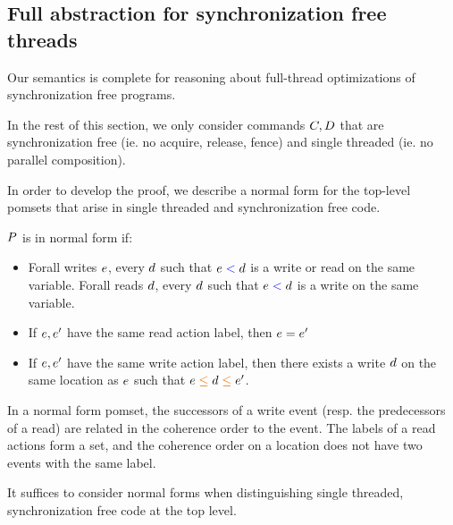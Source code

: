 \subsection{Full abstraction for synchronization free threads}
Our semantics is complete for reasoning about full-thread optimizations of synchronization free programs.

In the rest of this section, we only consider commands $C,D$ that are synchronization free (ie. no acquire, release, fence) and single threaded (ie. no parallel composition). 

In order to develop the proof, we describe a normal form for the top-level pomsets that arise in single threaded and synchronization free code.  

\begin{definition}
$P$ is in normal form if:
\begin{itemize}
\item Forall writes $e$, every $d$ such that $e \mathrel{{\color{blue}<}} d$ is a write or read on the same variable.
        Forall reads  $d$, every $d$ such that $e \mathrel{{\color{blue}<}} d$ is a write on the same variable. 
    
\item If $e, e'$ have the same read action label, then $e = e'$
\item  If $e, e'$ have the same write action label, then there exists a write $d$ on the same location as $e$ such that $\aEv \gtN \bEv \gtN \aEv'$.
\end{itemize}
\end{definition}
In a normal form pomset, the successors of a write event (resp. the predecessors of a read) are related in the coherence order to the event.  The labels of a read actions form a set, and the coherence order on a location does not have two events with the same label. 

It suffices to consider normal forms when distinguishing single threaded, synchronization free code at the top level. 

